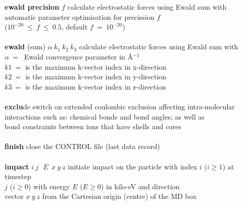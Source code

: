 \begin{tabbing}
\> {\bf ewald precision} $f$                    \> calculate electrostatic forces using Ewald sum with \\
\>                                              \> automatic parameter optimisation for precission $f$ \\
\>                                              \> ($10^{-20}~\le~f~\le~0.5$, default $f~=~10^{-20}$) \\
\>                                              \> \\
\> {\bf ewald} (sum) $\alpha~k_{1}~k_{2}~k_{3}$ \> calculate electrostatic forces using Ewald sum with \\
\>                                              \> $\alpha~=~$ Ewald convergence parameter in \AA$^{-1}$ \\
\>                                              \> $k1~=$ is the maximum k-vector index in x-direction \\
\>                                              \> $k2~=$ is the maximum k-vector index in y-direction \\
\>                                              \> $k3~=$ is the maximum k-vector index in z-direction \\
\>                                              \> \\
\> {\bf exclu}de                                \> switch on extended coulombic exclusion affecting intra-molecular \\
\>                                              \> interactions such as: chemical bonds and bond angles; as well as \\
\>                                              \> bond constraints between ions that have shells and cores \\
\>                                              \> \\
\> {\bf finish}                                 \> close the CONTROL file (last data record) \\
\>                                              \> \\
\> {\bf impact} $i~j~~~E~~x~y~z$                \> initiate impact on the particle with index $i$ ($i \ge 1$) at timestep \\
\>                                              \> $j$ ($i \ge 0$) with energy $E$ ($E \ge 0$) in kilo-eV and direction \\
\>                                              \> vector $x~y~z$ from the Cartesian origin (centre) of the MD box \\

\end{tabbing}

